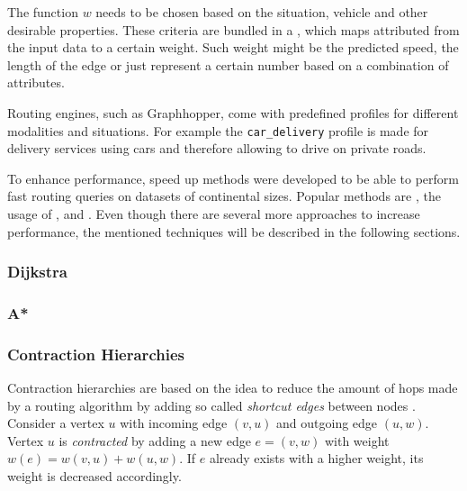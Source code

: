		The function $w$ needs to be chosen based on the situation, vehicle and other desirable properties.
		These criteria are bundled in a , which maps attributed from the input data to a certain weight.
		Such weight might be the predicted speed\cite{graphhopper-profile-bike-speeds}, the length of the edge\cite{graphhopper-profile-shortest} or just represent a certain number based on a combination of attributes\cite{graphhopper-profile-short-fastest}.
		
		Routing engines, such as Graphhopper, come with predefined profiles for different modalities and situations.
		For example the \texttt{car\_delivery} profile is made for delivery services using cars and therefore allowing to drive on private roads\cite{graphhopper-routing-profiles}.
		
		To enhance performance, speed up methods were developed to be able to perform fast routing queries on datasets of continental sizes.
		Popular methods are , the usage of ,  and .
		Even though there are several more approaches to increase performance, the mentioned techniques will be described in the following sections.
		
		\subsubsection{Dijkstra}
		
		\subsubsection{A*}
		\label{subsubsec:astar}
		
		\subsubsection{Contraction Hierarchies}
		
			Contraction hierarchies are based on the idea to reduce the amount of hops made by a routing algorithm by adding so called \emph{shortcut edges} between nodes \cite{geisberger-contraction-hierarchies}.
			Consider a vertex $u$ with incoming edge $(v, u)$ and outgoing edge $(u, w)$.
			Vertex $u$ is \emph{contracted} by adding a new edge $e = (v, w)$ with weight $w(e) = w(v, u) + w(u, w)$.
			If $e$ already exists with a higher weight, its weight is decreased accordingly.
			
